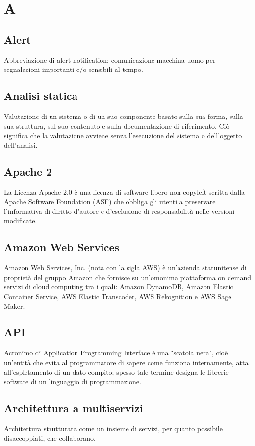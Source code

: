 \section*{A}

\subsection*{Alert}
Abbreviazione di alert notification; comunicazione macchina-uomo per segnalazioni importanti e/o sensibili al tempo.

\subsection*{Analisi statica}
Valutazione di un sistema o di un suo componente basato sulla sua forma, sulla sua struttura, sul suo contenuto e sulla documentazione di riferimento. Ciò significa che la valutazione avviene senza l'esecuzione del sistema o dell'oggetto dell'analisi.

\subsection*{Apache 2}
La Licenza Apache 2.0 è una licenza di software libero non copyleft scritta dalla Apache Software Foundation (ASF) che obbliga gli utenti a preservare l'informativa di diritto d'autore e d'esclusione di responsabilità nelle versioni modificate. 

\subsection*{Amazon Web Services}
Amazon Web Services, Inc. (nota con la sigla AWS) è un'azienda statunitense di proprietà del gruppo Amazon che fornisce su un'omonima piattaforma on demand servizi di cloud computing tra i quali: Amazon DynamoDB, Amazon Elastic Container Service, AWS Elastic Transcoder, AWS Rekognition e AWS Sage Maker.

\subsection*{API}
Acronimo di Application Programming Interface è una "scatola nera", cioè un'entità che evita al programmatore di sapere come funziona internamente, atta all'espletamento di un dato compito; spesso tale termine designa le librerie software di un linguaggio di programmazione.

\subsection*{Architettura a multiservizi}
Architettura strutturata come un insieme di servizi, per quanto possibile disaccoppiati, che collaborano.

